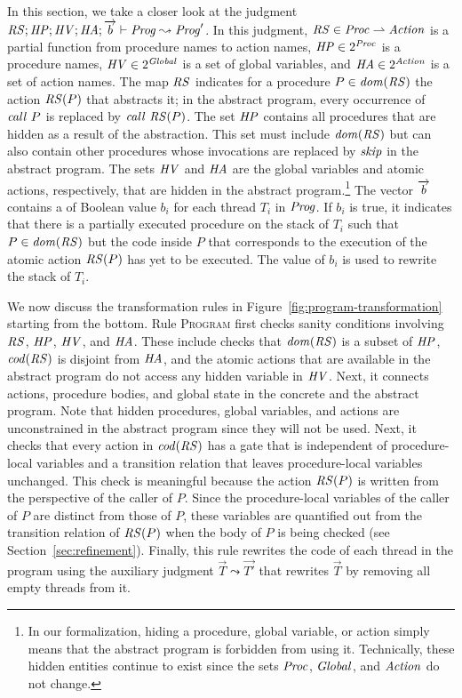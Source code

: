 In this section, we take a closer look at the judgment
$\mathit{RS};\mathit{HP};\mathit{HV};\mathit{HA};\overrightarrow{b} \vdash \mathit{Prog} \leadsto \mathit{Prog}'$.
In this judgment, 
$\mathit{RS} \in \mathit{Proc} \rightharpoonup \mathit{Action}$ is a partial function from procedure names to action names,
$\mathit{HP} \in 2^{\mathit{Proc}}$ is a procedure names,
$\mathit{HV} \in 2^{\mathit{Global}}$ is a set of global variables,
and $\mathit{HA} \in 2^{\mathit{Action}}$ is a set of action names.
The map $\mathit{RS}$ indicates for a procedure $P \in \mathit{dom}(\mathit{RS})$ the action $\mathit{RS}(P)$ 
that abstracts it;
in the abstract program, every occurrence of $\mathit{call}\ P$ is replaced by $\mathit{call}\ \mathit{RS}(P)$.
The set $\mathit{HP}$ contains all procedures that are hidden as a result of the abstraction.
This set must include $\mathit{dom}(\mathit{RS})$ but can also contain other procedures whose invocations 
are replaced by $\mathit{skip}$ in the abstract program.
The sets $\mathit{HV}$ and $\mathit{HA}$ are the global variables and atomic actions, 
respectively, that are hidden in the abstract program.\footnote{In our formalization, 
hiding a procedure, global variable, or action simply means that the abstract program is forbidden from using it.
Technically, these hidden entities continue to exist since the sets $\mathit{Proc}$, $\mathit{Global}$, and $\mathit{Action}$ do not change.}
The vector $\overrightarrow{b}$ contains a of Boolean value $b_i$ for each thread $T_i$ in $\mathit{Prog}$.
If $b_i$ is true, it indicates that there is a partially executed procedure on the stack of $T_i$ 
such that $P \in \mathit{dom}(\mathit{RS})$ but the code inside $P$ that corresponds to the execution of the atomic action $\mathit{RS}(P)$
has yet to be executed.
The value of $b_i$ is used to rewrite the stack of $T_i$.

We now discuss the transformation rules in Figure~\ref{fig:program-transformation} starting from the bottom.
Rule \textsc{Program} first checks sanity conditions involving $\mathit{RS}$, $\mathit{HP}$, $\mathit{HV}$, 
and $\mathit{HA}$.  These include checks that $\mathit{dom}(\mathit{RS})$ is a subset of $\mathit{HP}$,
$\mathit{cod}(\mathit{RS})$ is disjoint from $\mathit{HA}$, and the atomic actions that are 
available in the abstract program do not access any hidden variable in $\mathit{HV}$.
Next, it connects actions, procedure bodies, and global state in the concrete and the abstract program.
Note that hidden procedures, global variables, and actions are unconstrained in the abstract program since they will not be used.
Next, it checks that every action in $\mathit{cod}(\mathit{RS})$ has a gate 
that is independent of procedure-local variables and a transition relation that leaves 
procedure-local variables unchanged.  
This check is meaningful because the action $\mathit{RS}(P)$ is written from the 
perspective of the caller of $P$.
Since the procedure-local variables of the caller of $P$ are distinct from those of $P$,
these variables are quantified out from the transition relation of $\mathit{RS}(P)$ when 
the body of $P$ is being checked (see Section~\ref{sec:refinement}).
Finally, this rule rewrites the code of each thread in the program using the auxiliary judgment 
$\overrightarrow{T} \leadsto \overrightarrow{T'}$ that rewrites $\overrightarrow{T}$ by removing all empty threads from it.

